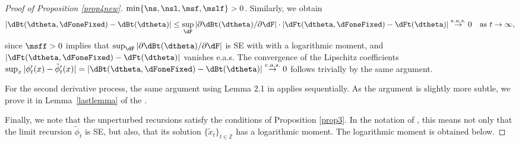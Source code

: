 \begin{proof}[Proof of Proposition \ref{prop4new}]
$\min\{\ns,\nsl,\msf,\mslf\}>0$. Similarly, we obtain 
\begin{equation*}
|\dBt(\dtheta,\dFoneFixed)-\dBt(\dtheta)|\leq 	\sup_{\dF} |\partial \dBt(\dtheta) / \partial \dF | \cdot |\dFt(\dtheta,\dFoneFixed) - \dFt(\dtheta)| \stackrel{e.a.s.}{\to}0 \quad \text{as} \ t\to \infty,
\end{equation*}  
since $\msff>0$ implies that $\sup_{\dF} |\partial \dBt(\dtheta) / \partial \dF |$ is SE with with a logarithmic moment, and  $|\dFt(\dtheta,\dFoneFixed) - \dFt(\dtheta)|$ vanishes e.a.s.
%
The convergence of the Lipschitz coefficients $\sup_{x}|\phi_t'(x)-\tilde \phi_t'(x)| = |\dBt(\dtheta,\dFoneFixed)-\dBt(\dtheta)|\stackrel{e.a.s.}{\to} 0$ follows trivially by the same argument.

For the second derivative process, the same argument using 
Lemma 2.1 in \cite{smikosch2006} applies sequentially. As the argument is slightly more subtle, 
we prove it in Lemma~\ref{lastlemma} of the \SupplementaryAppendix.

Finally, we note that the unperturbed recursions  satisfy the conditions of Proposition \ref{prop3}. In the notation of \cite{smikosch2006},  this means not only that the limit recursion $\tilde{\phi}_{t}$ is SE, but also, that its solution $\{\tilde x_{t}\}_{t \in \mathbb{Z}}$ has a logarithmic moment. The logarithmic moment is obtained below.


\end{proof}
